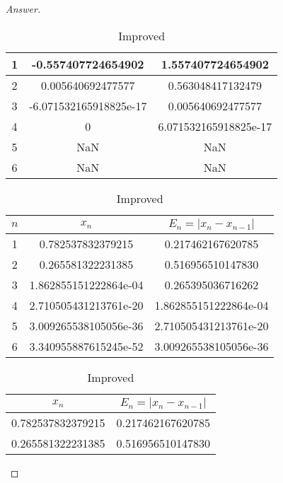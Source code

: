 \begin{enumerate}
\begin{proof}[Answer]
\begin{table}[H]
\begin{subtable}[t]{.8\textwidth}
\begin{table}[htbp]
\begin{subtable}[t]{.49\linewidth}
\begin{tabular}[t]{|c|c|c|}
			\scriptsize	1	&	\scriptsize	-0.557407724654902		&	\scriptsize	1.557407724654902	\\	\hline
			\scriptsize	2	&	\scriptsize	0.005640692477577		&	\scriptsize	0.563048417132479	\\	\hline
			\scriptsize	3	&	\scriptsize	-6.071532165918825e-17	&	\scriptsize	0.005640692477577	\\	\hline
			\scriptsize	4	&	\scriptsize	0						&	\scriptsize	6.071532165918825e-17	\\	\hline
			\scriptsize	5	&	\scriptsize	NaN						&	\scriptsize	NaN	\\	\hline
			\scriptsize	6	&	\scriptsize	NaN						&	\scriptsize	NaN	\\	\hline
			\end{tabular}
		\end{subtable}
		\ifnum\webview=1
			\begin{subtable}[t]{.8\textwidth}
			\centering
			\caption{Improved}
			\begin{tabular}{|c|c|c|}
				\hline
				\normalsize	$n$	& \normalsize	\(x_n\)	&	\normalsize	\(E_n=|x_n-x_{n-1}|\)	\\	\hline
				\scriptsize	1	&	\scriptsize	0.782537832379215		&	\scriptsize	0.217462167620785	\\	\hline
				\scriptsize	2	&	\scriptsize	0.265581322231385		&	\scriptsize	0.516956510147830	\\	\hline
				\scriptsize	3	&	\scriptsize	1.862855151222864e-04	&	\scriptsize	0.265395036716262	\\	\hline
				\scriptsize	4	&	\scriptsize	2.710505431213761e-20	&	\scriptsize	1.862855151222864e-04	\\	\hline
				\scriptsize	5	&	\scriptsize	3.009265538105056e-36	&	\scriptsize	2.710505431213761e-20	\\	\hline
				\scriptsize	6	&	\scriptsize	3.340955887615245e-52	&	\scriptsize	3.009265538105056e-36	\\	\hline
			\end{tabular}
			\end{subtable}
		\else
			\begin{subtable}[t]{.49\linewidth}
			\centering
			\caption{Improved}
			\begin{tabular}{|c|c|}
				\hline
				\normalsize	\(x_n\)	&	\normalsize	\(E_n=|x_n-x_{n-1}|\)	\\	\hline
				\scriptsize	0.782537832379215		&	\scriptsize	0.217462167620785	\\	\hline
				\scriptsize	0.265581322231385		&	\scriptsize	0.516956510147830	\\	\hline

\end{tabular}
\end{subtable}
\end{table}
\end{subtable}
\end{table}
\end{proof}
\end{enumerate}
